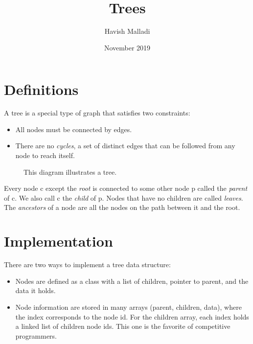 \documentclass{article}
\title{Trees}
\author{Havish Malladi}
\date{November 2019}
\begin{document}
\maketitle

\section{Definitions}
A tree is a special type of graph that satisfies two constraints:
\begin{itemize}
    \item All nodes must be connected by edges.
    \item There are no \textit{cycles}, a set of distinct edges that can be followed from any node to reach itself.
\end{itemize}

\begin{figure}[h]
\centering
{}
\caption{This diagram illustrates a tree.}
\end{figure}

Every node c except the \textit{root} is connected to some other node p called the \textit{parent} of c. We also call c the \textit{child} of p. Nodes that have no children are called \textit{leaves}. The \textit{ancestors} of a node are all the nodes on the path between it and the root.  

\section{Implementation}
There are two ways to implement a tree data structure:
\begin{itemize}
    \item Nodes are defined as a class with a list of children, pointer to parent, and the data it holds.
    \item Node information are stored in many arrays (parent, children, data), where the index corresponds to the node id. For the children array, each index holds a linked list of children node ids. This one is the favorite of competitive programmers.
\end{itemize}
\end{document}
